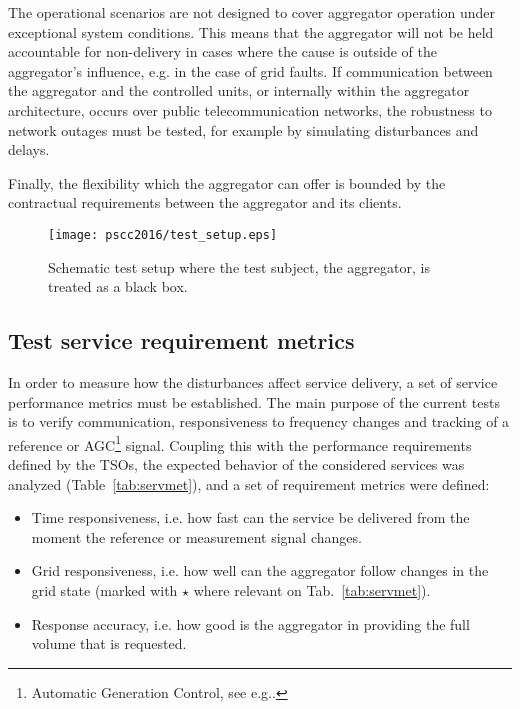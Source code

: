 The operational scenarios are not designed to cover aggregator operation under exceptional system conditions. This means that the aggregator will not be held accountable for non-delivery in cases where the cause is outside of the aggregator's influence, e.g. in the case of grid faults. If communication between the aggregator and the controlled units, or internally within the aggregator architecture, occurs over public telecommunication networks, the robustness to network outages must be tested, for example by simulating disturbances and delays.

Finally, the flexibility which the aggregator can offer is bounded by the contractual requirements between the aggregator and its clients.

\begin{figure}[!t]
\centering
\texttt{[image: pscc2016/test\_setup.eps]}
\caption{Schematic test setup where the test subject, the aggregator, is treated as a black box.}
\label{fig:test_setup}
\end{figure}

\subsection{Test service requirement metrics}\label{sec:servreqmet}

In order to measure how the disturbances affect service delivery, a set of service performance metrics must be established. The main purpose of the current tests is to verify communication, responsiveness to frequency changes and tracking of a reference or AGC\footnote{Automatic Generation Control, see e.g.\cite{entso1operational}.} signal. Coupling this with the performance requirements defined by the TSOs\cite{energinettender,ipower2013development}, the expected behavior of the considered services was analyzed (Table~\ref{tab:servmet}), and a set of requirement metrics were defined:
\begin{itemize}
\item Time responsiveness, i.e. how fast can the service be delivered from the moment the reference or measurement signal changes.
\item Grid responsiveness, i.e. how well can the aggregator follow changes in the grid state (marked with $\star$ where relevant on Tab.~\ref{tab:servmet}).
\item Response accuracy, i.e. how good is the aggregator in providing the full volume that is requested.
\end{itemize}


